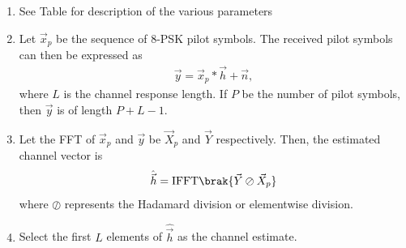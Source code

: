 \begin{enumerate}[label=\thesubsection.\arabic*.,ref=\thesubsection.\theenumi]

\item See Table for description of the various parameters
\item Let $\vec{x}_p$ be the sequence of 8-PSK pilot symbols.  The received pilot symbols can then be expressed as
\begin{align}
\vec{y} = \vec{x}_p * \vec{h} + \vec{n}, 
\end{align}
where $L$ is the channel response  length.  If $P$ be the number of pilot symbols, then $\vec{y}$ is of length $P+L-1$.
\item Let the FFT of $\vec{x}_p$ and $\vec{y}$  be $\vec{X}_p$ and $\vec{Y}$ respectively.  Then, the estimated channel vector is
\begin{align}
\hat{\vec{h}} = \text{IFFT}\brak{\vec{Y}\oslash \vec{X}_p}
\end{align}
where $\oslash$ represents the Hadamard division or elementwise division. 
\item Select the first $L$ elements of $\hat{\vec{h}}$ as the channel estimate.
\end{enumerate}
